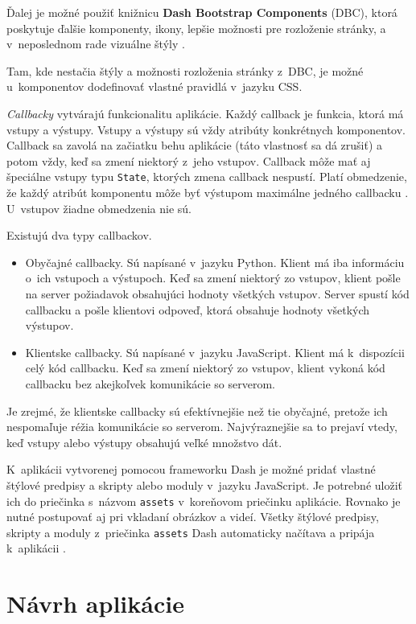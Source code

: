 Ďalej je možné použiť knižnicu \textbf{Dash Bootstrap Components} (DBC), ktorá poskytuje ďalšie komponenty, ikony, lepšie možnosti pre rozloženie stránky, a v~neposlednom rade vizuálne štýly \cite{dbc_documentation}.

Tam, kde nestačia štýly a možnosti rozloženia stránky z~DBC, je možné u~komponentov dodefinovať vlastné pravidlá v~jazyku CSS.

\emph{Callbacky} vytvárajú funkcionalitu aplikácie. Každý callback je funkcia, ktorá má vstupy a výstupy. Vstupy a výstupy sú vždy atribúty konkrétnych komponentov. Callback sa zavolá na začiatku behu aplikácie (táto vlastnosť sa dá zrušiť) a potom vždy, keď sa zmení niektorý z~jeho vstupov. Callback môže mať aj špeciálne vstupy typu \texttt{State}, ktorých zmena callback nespustí. Platí obmedzenie, že každý atribút komponentu môže byť výstupom maximálne jedného callbacku \cite{dash_documentation}. U~vstupov žiadne obmedzenia nie sú.

Existujú dva typy callbackov.
\begin{itemize}
    \item Obyčajné callbacky. Sú napísané v~jazyku Python. Klient má iba informáciu o~ich vstupoch a výstupoch. Keď sa zmení niektorý zo vstupov, klient pošle na server požiadavok obsahujúci hodnoty všetkých vstupov. Server spustí kód callbacku a pošle klientovi odpoveď, ktorá obsahuje hodnoty všetkých výstupov.
    \item Klientske callbacky. Sú napísané v~jazyku JavaScript. Klient má k~dispozícii celý kód callbacku. Keď sa zmení niektorý zo vstupov, klient vykoná kód callbacku bez akejkoľvek komunikácie so serverom.
\end{itemize}

Je zrejmé, že klientske callbacky sú efektívnejšie než tie obyčajné, pretože ich nespomaľuje réžia komunikácie so serverom. Najvýraznejšie sa to prejaví vtedy, keď vstupy alebo výstupy obsahujú veľké množstvo dát.

K~aplikácii vytvorenej pomocou frameworku Dash je možné pridať vlastné štýlové predpisy a skripty alebo moduly v~jazyku JavaScript. Je potrebné uložiť ich do priečinka s~názvom \texttt{assets} v~koreňovom priečinku aplikácie. Rovnako je nutné postupovať aj pri vkladaní obrázkov a videí. Všetky štýlové predpisy, skripty a moduly z~priečinka \texttt{assets} Dash automaticky načítava a pripája k~aplikácii \cite{dash_documentation}.

\chapter{Návrh aplikácie}
\label{ch:navrh}

